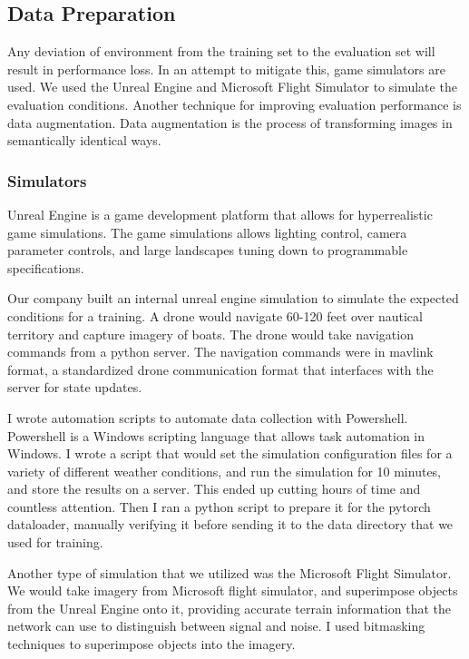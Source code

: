 \documentclass[12pt]{article}
\begin{document}
\subsection{Data Preparation}
Any deviation of environment from the training set to the evaluation set will result in performance loss. In an attempt to mitigate this, game simulators are used. We used the Unreal Engine and Microsoft Flight Simulator to simulate the evaluation conditions. Another technique for improving evaluation performance is data augmentation. Data augmentation is the process of transforming images in semantically identical ways. 
  
\subsubsection{Simulators}
Unreal Engine is a game development platform that allows for hyperrealistic game simulations. The game simulations allows lighting control, camera parameter controls, and large landscapes tuning down to programmable specifications.

Our company built an internal unreal engine simulation to simulate the expected conditions for a training. A drone would navigate 60-120 feet over nautical territory and capture imagery of boats. The drone would take navigation commands from a python server. The navigation commands were in mavlink format, a standardized drone communication format that interfaces with the server for state updates. \cite{UsingPymavlinkLibraries}

I wrote automation scripts to automate data collection with Powershell. Powershell is a Windows scripting language that allows task automation in Windows. I wrote a script that would set the simulation configuration files for a variety of different weather conditions, and run the simulation for 10 minutes, and store the results on a server. This ended up cutting hours of time and countless attention. Then I ran a python script to prepare it for the pytorch dataloader, manually verifying it before sending it to the data directory that we used for training.

Another type of simulation that we utilized was the Microsoft Flight Simulator. We would take imagery from Microsoft flight simulator, and superimpose objects from the Unreal Engine onto it, providing accurate terrain information that the network can use to distinguish between signal and noise. I used bitmasking techniques to superimpose objects into the imagery.
\end{document}

